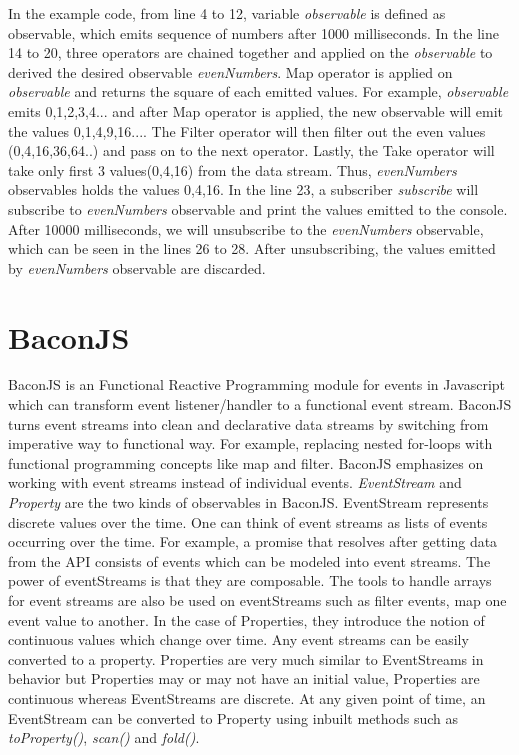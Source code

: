 In the example code, from line 4 to 12, variable \textit{observable} is defined as observable, which emits sequence of numbers after 1000 milliseconds. In the line 14 to 20, three operators are chained together and applied on the \textit{observable} to derived the desired observable \textit{evenNumbers}. Map operator is applied on \textit{observable} and returns the square of each emitted values. For example, \textit{observable} emits 0,1,2,3,4... and after Map operator is applied, the new observable will emit the values 0,1,4,9,16.... The Filter operator will then filter out the even values (0,4,16,36,64..) and pass on to the next operator. Lastly, the Take operator will take only first 3 values(0,4,16) from the data stream. Thus, \textit{evenNumbers} observables holds the values 0,4,16. In the line 23, a subscriber \textit{subscribe} will subscribe to \textit{evenNumbers} observable and print the values emitted to the console. After 10000 milliseconds, we will unsubscribe to the \textit{evenNumbers} observable, which can be seen in the lines 26 to 28. After unsubscribing, the values emitted by \textit{evenNumbers} observable are discarded.


\section{BaconJS}
BaconJS is an Functional Reactive Programming module for events in Javascript which can transform event listener/handler to a functional event stream. BaconJS turns event streams into clean and declarative data streams by switching from imperative way to functional way. For example, replacing nested for-loops with functional programming concepts like map and filter. BaconJS emphasizes on working with event streams instead of individual events. \textit{EventStream} and \textit{Property} are the two kinds of observables in BaconJS. EventStream represents discrete values over the time. One can think of event streams as lists of events occurring over the time. For example, a promise that resolves after getting data from the API consists of events which can be modeled into event streams. The power of eventStreams is that they are composable. The tools to handle arrays for event streams are also be used on eventStreams such as filter events, map one event value to another. In the case of Properties, they introduce the notion of continuous values which change over time. Any event streams can be easily converted to a property.  Properties are very much similar to EventStreams in behavior but Properties may or may not have an initial value, Properties are continuous whereas EventStreams are discrete. At any given point of time, an EventStream can be converted to Property using inbuilt methods such as \textit{toProperty()}, \textit{scan()} and \textit{fold()}\cite{baconBlog}. 


